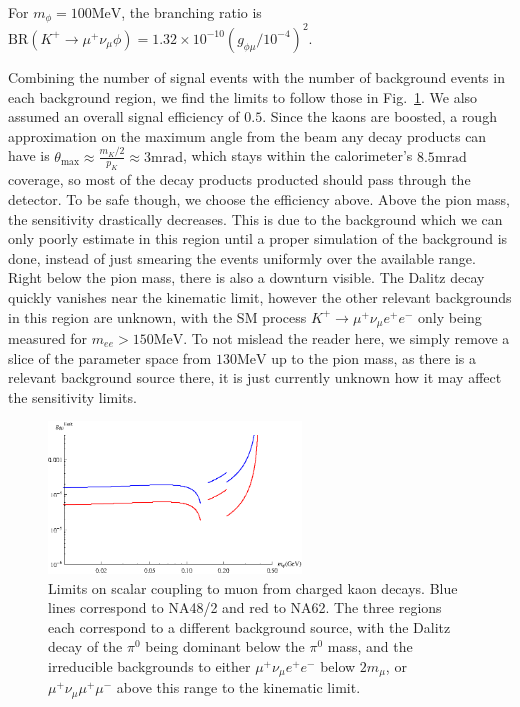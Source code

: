 \noindent For $m_\phi = 100\textrm{MeV}$, the branching ratio is $\textrm{BR}(K^+ \rightarrow \mu^+ \nu_\mu \phi) = 1.32\times 10^{-10} \left(g_{\phi\mu}/10^{-4}\right)^2$.

Combining the number of signal events with the number of background events in each background region, we find the limits to follow those in Fig.~\ref{fig:kaon_limits}.
We also assumed an overall signal efficiency of $0.5$.
Since the kaons are boosted, a rough approximation on the maximum angle from the beam any decay products can have is $\theta_\textrm{max} \approx \frac{m_K/2}{p_K} \approx 3\textrm{mrad}$, which stays within the calorimeter's $8.5\textrm{mrad}$ coverage, so most of the decay products producted should pass through the detector.
To be safe though, we choose the efficiency above.
Above the pion mass, the sensitivity drastically decreases.
This is due to the background which we can only poorly estimate in this region until a proper simulation of the background is done, instead of just smearing the events uniformly over the available range.
Right below the pion mass, there is also a downturn visible.
The Dalitz decay quickly vanishes near the kinematic limit, however the other relevant backgrounds in this region are unknown, with the SM process $K^+ \rightarrow \mu^+ \nu_\mu e^+ e^-$ only being measured for $m_{ee} > 150\textrm{MeV}$.
To not mislead the reader here, we simply remove a slice of the parameter space from $130\textrm{MeV}$ up to the pion mass, as there is a relevant background source there, it is just currently unknown how it may affect the sensitivity limits.

\begin{figure}[h]
    \centering
    \includegraphics[width=0.6\textwidth]{Figures/limits/kaon_all}
    \caption{Limits on scalar coupling to muon from charged kaon decays. Blue lines correspond to NA48/2 and red to NA62. The three regions each correspond to a different background source, with the Dalitz decay of the $\pi^0$ being dominant below the $\pi^0$ mass, and the irreducible backgrounds to either $\mu^+ \nu_\mu e^+ e^-$ below $2m_\mu$, or $\mu^+ \nu_\mu \mu^+ \mu^-$ above this range to the kinematic limit.}
    \label{fig:kaon_limits}
\end{figure}
